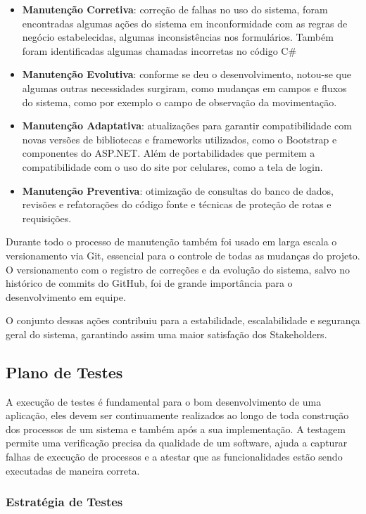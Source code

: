 \documentclass[
	12pt,				%
	openany,			%
	twoside,			%
	a4paper,			%
	english,			%
	brazil				%
	]{abntex2}
\begin{document}
\begin{itemize}
    \item \textbf{Manutenção Corretiva}: correção de falhas no uso do sistema, foram encontradas algumas ações do sistema em inconformidade com as regras de negócio estabelecidas, algumas inconsistências nos formulários. Também foram identificadas algumas chamadas incorretas no código C\#  
    \item \textbf{Manutenção Evolutiva}: conforme se deu o desenvolvimento, notou-se que algumas outras necessidades surgiram, como mudanças em campos e fluxos do sistema, como por exemplo o campo de observação da movimentação.
    \item \textbf{Manutenção Adaptativa}: atualizações para garantir compatibilidade com novas versões de bibliotecas e frameworks utilizados, como o Bootstrap e componentes do ASP.NET. Além de portabilidades que permitem a compatibilidade com o uso do site por celulares, como a tela de login.
    \item \textbf{Manutenção Preventiva}: otimização de consultas do banco de dados, revisões e refatorações do código fonte e técnicas de proteção de rotas e requisições.
\end{itemize}

Durante todo o processo de manutenção também foi usado em larga escala o versionamento via Git, essencial para o controle de todas as mudanças do projeto. O versionamento com o registro de correções e da evolução do sistema, salvo no histórico de commits do GitHub, foi de grande importância para o desenvolvimento em equipe.

O conjunto dessas ações contribuiu para a estabilidade, escalabilidade e segurança geral do sistema, garantindo assim uma maior satisfação dos Stakeholders.

\subsection{Plano de Testes}

A execução de testes é fundamental para o bom desenvolvimento de uma aplicação, eles devem ser continuamente realizados ao longo de toda construção dos processos de um sistema e também após a sua implementação. A testagem permite uma verificação precisa da qualidade de um software, ajuda a capturar falhas de execução de processos e a atestar que as funcionalidades estão sendo executadas de maneira correta.

\subsubsection{Estratégia de Testes}
\end{document}
